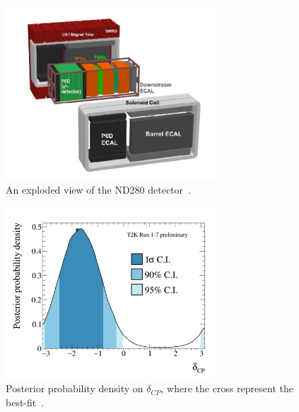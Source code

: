 \begin{figure}[h!]
\centering
  \centering
\includegraphics[width=0.7\textwidth]{figures/ND280det.jpeg}
\vspace{2mm}
\caption{An exploded view of the ND280 detector~\cite{130Assylbekov}.}
\label{fig:ND280det}
\end{figure}

\begin{figure}[h!]
\centering
  \centering
\includegraphics[width=0.7\textwidth]{figures/t2k1.jpeg}
\vspace{2mm}
\caption{Posterior probability density on $\delta_{CP}$, where the cross represent the best-fit~\cite{T2Kfigures}.}
\label{fig:T2KCP}
\end{figure}

